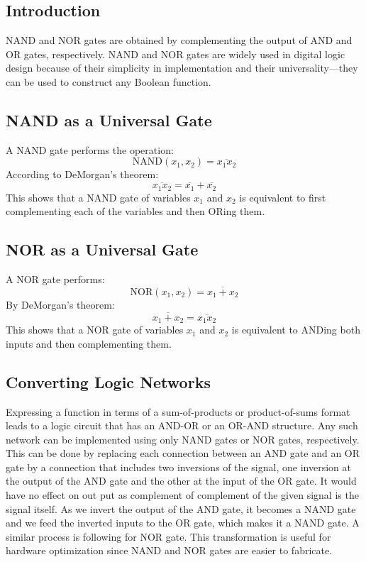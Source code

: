 \documentclass[twocolumn]{article}
\begin{document}
\subsection{Introduction}
NAND and NOR gates are obtained by complementing the output of AND and OR gates, respectively. NAND and NOR gates are widely used in digital logic design because of their simplicity in implementation and their universality—they can be used to construct any Boolean function.

\subsection{NAND as a Universal Gate}
A NAND gate performs the operation:
\[
\text{NAND}(x_1, x_2) = \overline{x_1 x_2}
\]
According to DeMorgan's theorem:
\[
\overline{x_1 x_2} = \overline{x_1} + \overline{x_2}
\]
This shows that a NAND gate of variables $x_1$ and $x_2$ is equivalent to first complementing each of the variables and then ORing them.

\subsection{NOR as a Universal Gate}
A NOR gate performs:
\[
\text{NOR}(x_1, x_2) = \overline{x_1 + x_2}
\]
By DeMorgan's theorem:
\[
\overline{x_1+x_2} = \overline{x_1 x_2}
\]
This shows that a NOR gate of variables $x_1$ and $x_2$ is equivalent to ANDing both inputs and then complementing them.
\subsection{Converting Logic Networks}
Expressing a function in terms of a sum-of-products or product-of-sums format leads to a logic circuit that has an AND-OR or an OR-AND structure. Any such network can be implemented using only NAND gates or NOR gates, respectively. This can be done by replacing each connection between an AND gate and an OR gate by a connection that includes two inversions of the signal, one inversion at the output of the AND gate and the other at the input of the OR gate. It would have no effect on out put as complement of complement of the given signal is the signal itself. As we invert the output of the AND gate, it becomes a NAND gate and we feed the inverted inputs to the OR gate, which makes it a NAND gate. A similar process is following for NOR gate. This transformation is useful for hardware optimization since NAND and NOR gates are easier to fabricate.
\end{document}
